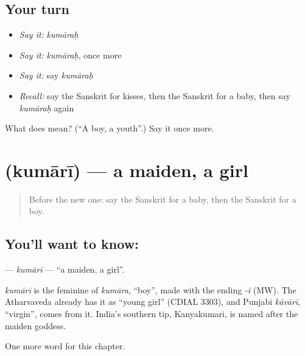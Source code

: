 \subsection*{Your turn}
\begin{itemize}
\raggedright
  \item \emph{Say it:} \emph{kumāraḥ}
  \item \emph{Say it:} \emph{kumāraḥ}, once more
  \item \emph{Say it:} say \emph{kumāraḥ}
  \item \emph{Recall:} say the Sanskrit for kisses, then the Sanskrit for a baby, then say \emph{kumāraḥ} again
\end{itemize}

\begin{tcolorbox}[breakable,colback=teal!4,colframe=teal!35!black,title={Before you move on}]
What does  mean? (\textquotedblleft{}A boy, a youth\textquotedblright{}.) Say it once more.
\end{tcolorbox}
\section[\texorpdfstring{\sk{कुमारी} (kumārī)}{कुमारी (kumārī)}]{ (kumārī) — a maiden, a girl}

\label{lesson:SA-C236-kumari}



\begin{quote}
Before the new one: say the Sanskrit for a baby, then the Sanskrit for a boy.
\end{quote}

\subsection*{You'll want to know: }
\textbf{} — \emph{kumārī} — \textquotedblleft{}a maiden, a girl\textquotedblright{}.

\begin{cousinweb}
\emph{kumārī} is the feminine of \emph{kumāra}, \textquotedblleft{}boy\textquotedblright{}, made with the ending \emph{-ī} (MW). The Atharvaveda already has it as \textquotedblleft{}young girl\textquotedblright{} (CDIAL 3303), and Punjabi \emph{kãvārī}, \textquotedblleft{}virgin\textquotedblright{}, comes from it. India's southern tip, Kanyakumari, is named after the maiden goddess.
\end{cousinweb}

\begin{grammarlens}[title={What you've built}]
One more word for this chapter.
\end{grammarlens}


